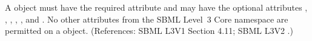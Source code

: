 A \LocalParameter object must have the required attribute  and
may have the optional attributes , , , ,
,  and .  No other attributes from
the SBML Level~3 Core namespace are permitted on a \LocalParameter object.
(References: SBML L3V1 Section 4.11; SBML L3V2 .)
